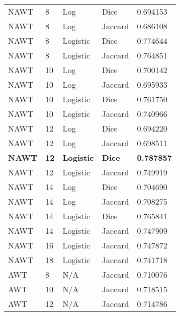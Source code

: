\documentclass{article}
\begin{document}
\begin{center}
	\scriptsize
    
    \tablelasttail{\hline}

      \begin{supertabular}{| l | l | l | l | l |}
            NAWT & 8 & Log & Dice & 0.694153 \\
            NAWT & 8 & Log & Jaccard & 0.686108 \\
            NAWT & 8 & Logistic & Dice & 0.774644 \\
            NAWT & 8 & Logistic & Jaccard & 0.764851 \\
            NAWT & 10 & Log & Dice & 0.700142 \\
            NAWT & 10 & Log & Jaccard & 0.695933 \\
            NAWT & 10 & Logistic & Dice & 0.761750 \\
            NAWT & 10 & Logistic & Jaccard & 0.740966 \\
            NAWT & 12 & Log & Dice & 0.694220 \\
            NAWT & 12 & Log & Jaccard & 0.698511 \\
            \textbf{NAWT} & \textbf{12} & \textbf{Logistic} & \textbf{Dice} & \textbf{0.787857} \\
            NAWT & 12 & Logistic & Jaccard & 0.749919 \\
            NAWT & 14 & Log & Dice & 0.704690 \\
            NAWT & 14 & Log & Jaccard & 0.708275 \\
            NAWT & 14 & Logistic & Dice & 0.765841 \\
            NAWT & 14 & Logistic & Jaccard & 0.747909 \\
            NAWT & 16 & Logistic & Jaccard & 0.747872 \\
            NAWT & 18 & Logistic & Jaccard & 0.741718 \\
            AWT & 8 & N/A & Jaccard & 0.710076 \\
            AWT & 10 & N/A & Jaccard & 0.718515 \\
            AWT & 12 & N/A & Jaccard & 0.714786 \\

\end{supertabular}
\end{center}
\end{document}
